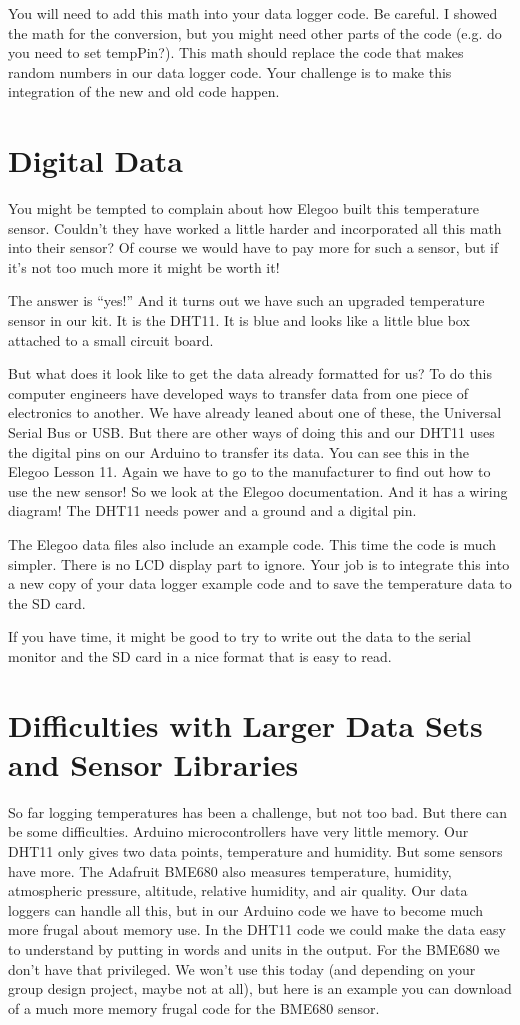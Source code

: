 You will need to add this math into your data logger code.  Be careful.  I showed the math for the conversion, but you might need other parts of the code (e.g. do you need to set tempPin?). This math should replace the code that makes random numbers in our data logger code.  Your challenge is to make this integration of the new and old code happen.

\section{Digital Data}
You might be tempted to complain about how Elegoo built this temperature sensor.  Couldn't they have worked a little harder and incorporated all this math into their sensor?  Of course we would have to pay more for such a sensor, but if it's not too much more it might be worth it!  

The answer is ``yes!'' And it turns out we have such an upgraded temperature sensor in our kit.  It is the DHT11.  It is blue and looks like a little blue box attached to a small circuit board.  

But what does it look like to get the data already formatted for us?  To do this computer engineers have developed ways to transfer data from one piece of electronics to another. We have already leaned about one of these, the Universal Serial Bus or USB.  But there are other ways of doing this and our DHT11 uses the digital pins on our Arduino to transfer its data. You can see this in the Elegoo Lesson 11. Again we have to go to the manufacturer to find out how to use the new sensor!  So we look at the Elegoo documentation. And it has a wiring diagram! The DHT11 needs power and a ground and a digital pin.

The Elegoo data files also include an example code. This time the code is much simpler. There is no LCD display part to ignore.  Your job is to integrate this into a new copy of your data logger example code and to save the temperature data to the SD card.

If you have time, it might be good to try to write out the data to the serial monitor and the SD card in a nice format that is easy to read.

\section{Difficulties with Larger Data Sets and Sensor Libraries}
So far logging temperatures has been a challenge, but not too bad. But there can be some difficulties. Arduino microcontrollers have very little memory. Our DHT11 only gives two data points, temperature and humidity. But some sensors have more. The Adafruit BME680 also measures temperature, humidity, atmospheric pressure, altitude, relative humidity, and air quality.  Our data loggers can handle all this, but in our Arduino code we have to become much more frugal about memory use.  In the DHT11 code we could make the data easy to understand by putting in words and units in the output.  For the BME680 we don't have that privileged.  We won't use this today (and depending on your group design project, maybe not at all), but here is an example you can download of a much more memory frugal code for the BME680 sensor.

